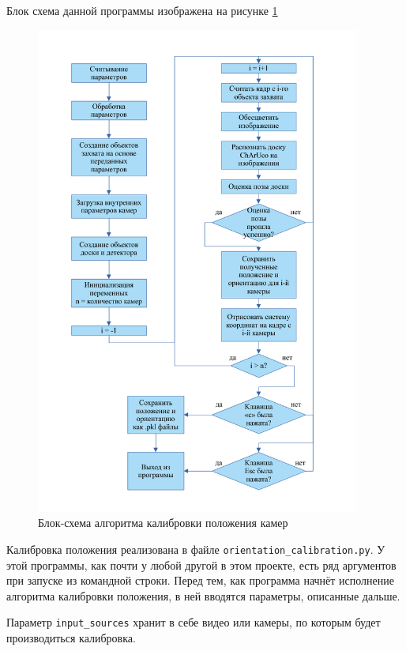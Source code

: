 \documentclass[14pt, a4paper]{extarticle}
\begin{document}
Блок схема данной программы изображена на рисунке \ref{fig:orientation_calibration_scheme}
\begin{figure}[h!]
  \begin{center}
    \includegraphics[width=0.95\textwidth]{images/block-schemes/orientation_scheme.png}
  \end{center}
  \caption{Блок-схема алгоритма калибровки положения камер}\label{fig:orientation_calibration_scheme}
\end{figure}
Калибровка положения реализована в файле \texttt{orientation\_calibration.py}.
У этой программы, как почти у любой другой в этом проекте, есть ряд аргументов
при запуске из командной строки. Перед тем, как программа начнёт исполнение
алгоритма калибровки положения, в ней вводятся параметры, описанные дальше.

Параметр \texttt{input\_sources} хранит в себе видео или камеры, по которым
будет производиться калибровка.
\end{document}
